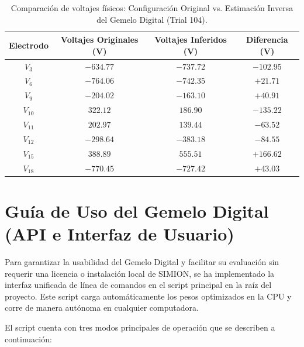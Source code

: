 \documentclass[12pt,letterpaper]{article}
\begin{document}
\begin{table}[H]
    \centering
    \caption{Comparación de voltajes físicos: Configuración Original vs. Estimación Inversa del Gemelo Digital (Trial 104).}
    \label{tab:voltage_comparison}
    \begin{tabular}{@{}cccc@{}}
        \toprule
        \textbf{Electrodo} & \textbf{Voltajes Originales (V)} & \textbf{Voltajes Inferidos (V)} & \textbf{Diferencia (V)} \\
        \midrule
        $V_3$  & $-634.77$ & $-737.72$ & $-102.95$ \\
        $V_6$  & $-764.06$ & $-742.35$ & $+21.71$  \\
        $V_9$  & $-204.02$ & $-163.10$ & $+40.91$  \\
        $V_{10}$ & $322.12$  & $186.90$  & $-135.22$ \\
        $V_{11}$ & $202.97$  & $139.44$  & $-63.52$  \\
        $V_{12}$ & $-298.64$ & $-383.18$ & $-84.55$  \\
        $V_{15}$ & $388.89$  & $555.51$  & $+166.62$ \\
        $V_{18}$ & $-770.45$ & $-727.42$ & $+43.03$  \\
        \bottomrule
    \end{tabular}
\end{table}

\section{Guía de Uso del Gemelo Digital (API e Interfaz de Usuario)}
Para garantizar la usabilidad del Gemelo Digital y facilitar su evaluación sin requerir una licencia o instalación local de SIMION, se ha implementado la interfaz unificada de línea de comandos en el script principal  en la raíz del proyecto. Este script carga automáticamente los pesos optimizados en la CPU y corre de manera autónoma en cualquier computadora.

El script cuenta con tres modos principales de operación que se describen a continuación:
\end{document}
